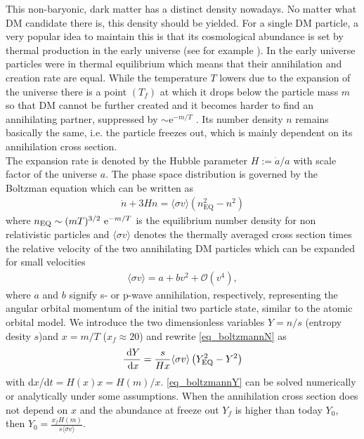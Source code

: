 This non-baryonic, dark matter has a distinct density nowadays. No matter what DM candidate there is, this density should be
yielded. For a single DM particle, a very popular idea to maintain this is that its cosmological abundance is set by thermal production in the 
early universe (see for example \cite{DM-EvCaDo}). In the early universe particles were in thermal equilibrium which means that their annihilation and
creation rate are equal. 
While the temperature $T$ lowers due to the expansion of the universe there is a point $(T_f)$ at which it drops below the particle mass $m$ so that 
DM cannot be further created 
and it becomes harder to find an annihilating partner, suppressed by $\sim \text{e}^{-m/T}$ \cite{1603.03797}. Its number density $n$ 
remains basically the same, i.e. the particle freezes out, which is mainly dependent on its annihilation cross section.\\
The expansion rate is denoted by the Hubble parameter $H:=\dot{a}/a$ with scale factor of the universe $a$. The phase space distribution is 
governed by the Boltzman equation \cite{DM-EvCaDo} which can be written as 
\begin{align}
 \dot{n} + 3Hn = \langle \sigma v\rangle \left(n_\text{EQ}^2 - n^2\right)
 \label{eq_boltzmannN}
\end{align}
where $n_\text{EQ}\sim (mT)^{3/2}\ \text{e}^{-m/T}$ is the equilibrium number density for non relativistic particles and $\langle\sigma v\rangle$ denotes 
the thermally averaged cross section times the relative velocity of the two annihilating DM particles which can be expanded for small velocities
\begin{align}
 \langle \sigma v \rangle = a + bv^2 + \mathcal{O}(v^4),
\end{align}
where $a$ and $b$ signify s- or p-wave annihilation, respectively, representing the angular orbital momentum of the initial two particle state,
similar to the atomic orbital model. We introduce the two dimensionless variables $Y=n/s$ (entropy desity $s$)and $x=m/T$ ($x_f\approx 20$) 
and rewrite \eqref{eq_boltzmannN} as
\begin{align}
 \frac{\; \mathrm{d} Y}{\; \mathrm{d} x} = \frac{s}{Hx}\langle \sigma v\rangle \left(Y_\text{EQ}^2 - Y^2\right)
 \label{eq_boltzmannY}
\end{align}
with d$x$/d$t = H(x) x = H(m)/x$. \eqref{eq_boltzmannY} can be solved numerically or analytically under some assumptions. When the annihilation
cross section does not depend on $x$ and the abundance at freeze out $Y_f$ is higher than today $Y_0$, then $Y_0=\frac{x_fH(m)}{s \langle \sigma v\rangle}$.
